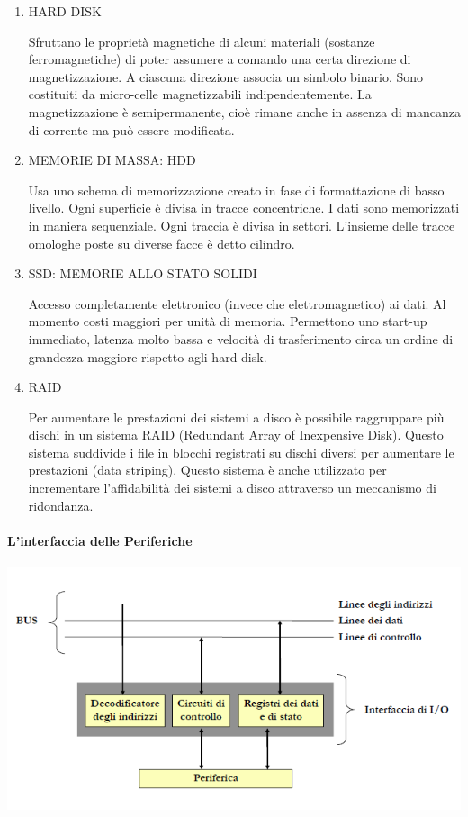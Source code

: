 \documentclass[
  paper=a4,
  oneside  ,captions=tableheading
]{scrbook}
\begin{document}
\begin{enumerate}
\def\labelenumi{\arabic{enumi}.}
\item
  HARD DISK

  Sfruttano le proprietà magnetiche di alcuni materiali (sostanze
  ferromagnetiche) di poter assumere a comando una certa direzione di
  magnetizzazione. A ciascuna direzione associa un simbolo binario. Sono
  costituiti da micro-celle magnetizzabili indipendentemente. La
  magnetizzazione è semipermanente, cioè rimane anche in assenza di
  mancanza di corrente ma può essere modificata.
\item
  MEMORIE DI MASSA: HDD

  Usa uno schema di memorizzazione creato in fase di formattazione di
  basso livello. Ogni superficie è divisa in tracce concentriche. I dati
  sono memorizzati in maniera sequenziale. Ogni traccia è divisa in
  settori. L'insieme delle tracce omologhe poste su diverse facce è
  detto cilindro.
\item
  SSD: MEMORIE ALLO STATO SOLIDI

  Accesso completamente elettronico (invece che elettromagnetico) ai
  dati. Al momento costi maggiori per unità di memoria. Permettono uno
  start-up immediato, latenza molto bassa e velocità di trasferimento
  circa un ordine di grandezza maggiore rispetto agli hard disk.
\item
  RAID

  Per aumentare le prestazioni dei sistemi a disco è possibile
  raggruppare più dischi in un sistema RAID (Redundant Array of
  Inexpensive Disk). Questo sistema suddivide i file in blocchi
  registrati su dischi diversi per aumentare le prestazioni (data
  striping). Questo sistema è anche utilizzato per incrementare
  l'affidabilità dei sistemi a disco attraverso un meccanismo di
  ridondanza.
\end{enumerate}

\hypertarget{linterfaccia-delle-periferiche}{%
\paragraph{L'interfaccia delle
Periferiche}\label{linterfaccia-delle-periferiche}}

\includegraphics{./image/image-20201112230056001.png}
\end{document}
